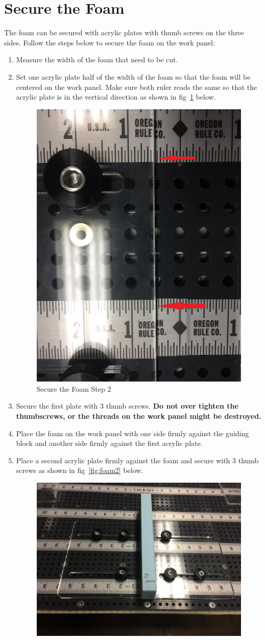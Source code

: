 \documentclass[titlepage,12pt,letter]{report}
\numberwithin{equation}{chapter}
\begin{document}
\section{Secure the Foam}
The foam can be secured with acrylic plates with thumb screws on the three sides. Follow the steps below to secure the foam on the work panel:
\begin{enumerate}[itemsep = 5pt,topsep=0pt]
	\item Measure the width of the foam that need to be cut.
	\item Set one acrylic plate half of the width of the foam so that the foam will be centered on the work panel. Make sure both ruler reads the same so that the acrylic plate is in the vertical direction as shown in fig~\ref{fig:foam1} below.
	\begin{figure} [H]
		\includegraphics[width = 0.45\linewidth]{./Figures/secure_foam/1.jpg}
		\caption{Secure the Foam Step 2}
		\label{fig:foam1}
	\end{figure}
	\item Secure the first plate with 3 thumb screws. \textbf{Do not over tighten the thumbscrews, or the threads on the work panel might be destroyed.}
	\item Place the foam on the work panel with one side firmly against the guiding block and another side firmly against the first acrylic plate.
	\item Place a second acrylic plate firmly against the foam and secure with 3 thumb screws as shown in fig~\ref{fig:foam2} below.
	\begin{figure} [H]
		\includegraphics[width = 0.6\linewidth]{./Figures/secure_foam/2.jpg}

\end{figure}
\end{enumerate}
\end{document}
